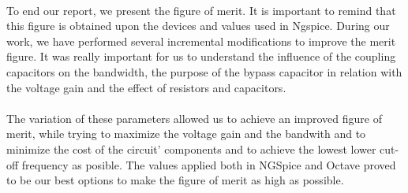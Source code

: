 \paragraph{}
To end our report, we present the figure of merit. It is important to remind that this figure is obtained upon the devices and values used in Ngspice. During our work, we have performed several incremental modifications to improve the merit figure. It was really important for us to understand the influence of the coupling capacitors on the bandwidth, the purpose of the bypass capacitor in relation with the voltage gain and the effect of resistors and capacitors. 

\paragraph{}
The variation of these parameters allowed us to achieve an improved figure of merit, while trying to maximize the voltage gain and the bandwith and to minimize the cost of the circuit' components and to achieve the lowest lower cut-off frequency as posible. The values applied both in NGSpice and Octave proved to be our best options to make the figure of merit as high as possible.
